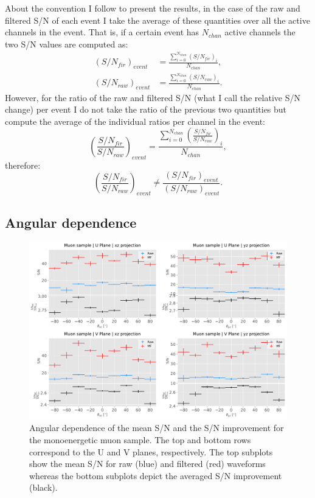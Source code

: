 About the convention I follow to present the results, in the case of the raw and filtered S/N of each event I take the average of these quantities over all the active channels in the event. That is, if a certain event has $N_{chan}$ active channels the two S/N values are computed as:
\begin{equation}
\begin{split}
\left(S/N_{fir}\right)_{event} &= \frac{\sum_{i=0}^{N_{chan}} \left(S/N_{fir}\right)_{i}}{N_{chan}},\\
\left(S/N_{raw}\right)_{event} &= \frac{\sum_{i=0}^{N_{chan}} \left(S/N_{raw}\right)_{i}}{N_{chan}}.
\end{split}
\end{equation}
However, for the ratio of the raw and filtered S/N (what I call the relative S/N change) per event I do not take the ratio of the previous two quantities but compute the average of the individual ratios per channel in the event:
\begin{equation}
\left(\frac{S/N_{fir}}{S/N_{raw}}\right)_{event} = \frac{\sum_{i=0}^{N_{chan}} \left(\frac{S/N_{fir}}{S/N_{raw}}\right)_{i}}{N_{chan}},
\end{equation}
therefore:
\begin{equation}
\left(\frac{S/N_{fir}}{S/N_{raw}}\right)_{event}  \neq \frac{\left(S/N_{fir}\right)_{event}}{\left(S/N_{raw}\right)_{event}}.
\end{equation}

\subsection{Angular dependence}
\label{subsec:2.5.1}

\begin{figure}[t]
	\centering
	\includegraphics[width=0.9\linewidth]{Images/Matched_Filter/larsoft_muon_angular_alt.pdf}
	\caption[Angular dependence of the mean S/N and the S/N improvement for the monoenergetic muon sample.]{Angular dependence of the mean S/N and the S/N improvement for the monoenergetic muon sample. The top and bottom rows correspond to the U and V planes, respectively. The top subplots show the mean S/N for raw (blue) and filtered (red) waveforms whereas the bottom subplots depict the averaged S/N improvement (black).}
	\label{fig:angular_muon}
\end{figure}

